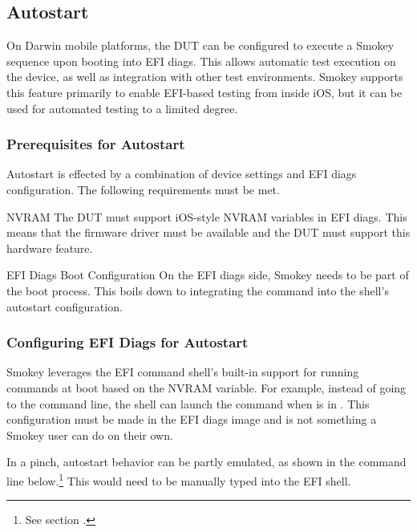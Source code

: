 \subsection{Autostart}
\label{sec:Autostart}

On Darwin mobile platforms, the DUT can be configured to execute a Smokey
sequence upon booting into EFI diags.  This allows automatic test execution on
the device, as well as integration with other test environments.  Smokey
supports this feature primarily to enable EFI-based testing from inside iOS,
but it can be used for automated testing to a limited degree.

\subsubsection{Prerequisites for Autostart}

Autostart is effected by a combination of device settings and EFI diags
configuration.  The following requirements must be met.

\begin{Descriptive}

	\item[NVRAM] The DUT must support iOS-style NVRAM variables in EFI
	diags.  This means that the firmware driver must be available and the
	DUT must support this hardware feature.

	\item[EFI Diags Boot Configuration] On the EFI diags side, Smokey needs
	to be part of the boot process.  This boils down to integrating the
	 command into the shell's autostart configuration.

\end{Descriptive}

\subsubsection{Configuring EFI Diags for Autostart}

Smokey leverages the EFI command shell's built-in support for running commands
at boot based on the  NVRAM variable.  For example, instead of
going to the command line, the shell can launch the  command
when  is in .  This configuration must be made
in the EFI diags image and is not something a Smokey user can do on their own.

In a pinch, autostart behavior can be partly emulated, as shown in the command
line below.\footnote{See section .}  This would need to
be manually typed into the EFI shell.

